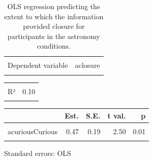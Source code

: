 \documentclass[
  letterpaper,
  DIV=11,
  numbers=noendperiod]{scrartcl}
\begin{document}
\hypertarget{tbl-aclosure}{}
\begin{table}[!h]
\caption{\label{tbl-aclosure}OLS regression predicting the extent to which the information provided
closure for participants in the astronomy conditions. }\tabularnewline

\centering
\begin{tabular}{lr}
\toprule
\cellcolor{gray!10}{Observations} & \cellcolor{gray!10}{235}\\
Dependent variable & aclosure\\
\cellcolor{gray!10}{Type} & \cellcolor{gray!10}{OLS linear regression}\\
\bottomrule
\end{tabular}
\end{table} \begin{table}[!h]
\centering
\begin{tabular}{lr}
\toprule
\cellcolor{gray!10}{F(2,232)} & \cellcolor{gray!10}{12.58}\\
R² & 0.10\\
\cellcolor{gray!10}{Adj. R²} & \cellcolor{gray!10}{0.09}\\
\bottomrule
\end{tabular}
\end{table} \begin{table}[!h]
\centering
\begin{threeparttable}
\begin{tabular}{lrrrr}
\toprule
  & Est. & S.E. & t val. & p\\
\midrule
\cellcolor{gray!10}{(Intercept)} & \cellcolor{gray!10}{2.17} & \cellcolor{gray!10}{0.16} & \cellcolor{gray!10}{13.52} & \cellcolor{gray!10}{0.00}\\
acuriousCurious & 0.47 & 0.19 & 2.50 & 0.01\\
\cellcolor{gray!10}{aresoResolution} & \cellcolor{gray!10}{0.80} & \cellcolor{gray!10}{0.19} & \cellcolor{gray!10}{4.27} & \cellcolor{gray!10}{0.00}\\
\bottomrule
\end{tabular}
\begin{tablenotes}
\item Standard errors: OLS
\end{tablenotes}
\end{threeparttable}
\end{table}
\end{document}

